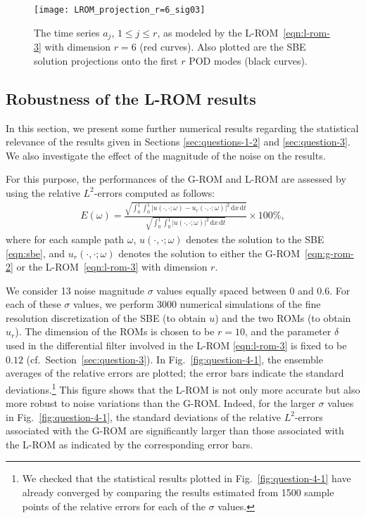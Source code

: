 \documentclass[11pt]{amsart}
\numberwithin{equation}{section}
\def\d{\, \mathrm{d}}
\newcommand{\attn}{\color{greenrb}} %
\begin{document}
\begin{figure} %
\begin{center}
	\texttt{[image: LROM\_projection\_r=6\_sig03]}	
	\caption{
	The time series $a_j$, $1\le j \le r$, as modeled by the L-ROM~\eqref{eqn:l-rom-3} with dimension $r=6$ (red curves). Also plotted are the SBE solution projections onto the first $r$ POD modes (black curves).
	}
	\label{fig:LROM_projection} 
	\end{center}
\end{figure}


    \subsection{Robustness of the L-ROM results}  %
	\label{sec:question-4}


In this section, we present some further numerical results regarding the statistical relevance of the results given in Sections \ref{sec:questions-1-2} and \ref{sec:question-3}. We also investigate the effect of the magnitude of the noise on the results. 

For this purpose, the performances of the G-ROM and L-ROM are assessed by using the relative $L^2$-errors computed as follows:
\begin{eqnarray} \label{eqn:rel_error}
	E(\omega)
	=  \frac{\sqrt{\int_{0}^1\int_{0}^1 |u(\cdot,\cdot; \omega) - u_r(\cdot,\cdot; \omega)|^2 \d x \d t}}{\sqrt{\int_{0}^1\int_{0}^1 |u(\cdot,\cdot; \omega)|^2 \d x \d t}} \times 100 \%,
\end{eqnarray}
where for each sample path $\omega$, $u(\cdot,\cdot; \omega)$ denotes the solution to the SBE \eqref{eqn:sbe}, and  $u_r(\cdot,\cdot; \omega)$ denotes the solution to either the G-ROM~\eqref{eqn:g-rom-2} or the L-ROM~\eqref{eqn:l-rom-3} with dimension $r$. 

We consider 13 noise magnitude $\sigma$ values equally spaced between $0$ and $0.6$.  For each of these $\sigma$ values, we perform $3000$ numerical simulations of the fine resolution discretization of the SBE (to obtain $u$) and the two ROMs (to obtain $u_r$). The dimension of the ROMs is chosen to be $r=10$, and the parameter $\delta$ used in the differential filter involved in the L-ROM \eqref{eqn:l-rom-3} is fixed to be $0.12$ (cf.~Section~\ref{sec:question-3}). In Fig.~\ref{fig:question-4-1}, the ensemble averages of the relative errors are plotted; the error bars indicate the standard deviations.\footnote{We checked that the statistical results plotted in Fig.~\ref{fig:question-4-1} have already converged by comparing the results estimated from 1500 sample points of the relative errors for each of the $\sigma$ values.} This figure shows that the L-ROM is not only more accurate but also more robust to noise variations than the G-ROM. Indeed, for the larger $\sigma$ values  in Fig.~\ref{fig:question-4-1}, the standard deviations of the relative $L^2$-errors associated with the G-ROM are significantly larger than those associated with the L-ROM as indicated by the corresponding error bars.
\end{document}
